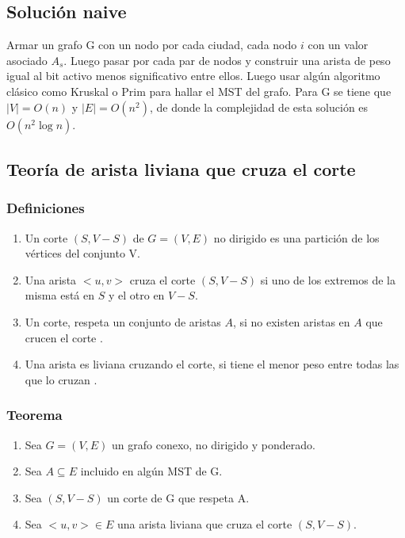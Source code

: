 \documentclass{article}
\begin{document}
\subsection{Solución naive}

Armar un grafo G con un nodo por cada ciudad, cada nodo $i$ con un valor asociado $A_s$. Luego pasar por cada par de nodos y construir una arista de peso igual al bit activo menos significativo entre ellos. Luego usar algún algoritmo clásico como Kruskal o Prim para hallar el MST del grafo. Para G se tiene que $|V| = O(n)$ y $|E| = O(n^2)$, de donde la complejidad de esta solución es $O(n^2 \log n)$.

\subsection{Teoría de arista liviana que cruza el corte}

\subsubsection{Definiciones}

\begin{enumerate}
    \item Un corte $(S, V-S)$ de $G=(V,E)$ no dirigido es una partición de los vértices del conjunto V.
    \item Una arista $<u,v>$ cruza el corte $(S, V-S)$ si uno de los extremos de la misma está en $S$ y el otro en $V-S$.
    \item Un corte, respeta un conjunto de aristas $A$, si no existen aristas en $A$ que crucen el corte .
    \item Una arista es liviana cruzando el corte, si tiene el menor peso entre todas las que lo cruzan .
\end{enumerate}

\subsubsection{Teorema}

\begin{enumerate}
    \item Sea $G=(V,E)$ un grafo conexo, no dirigido y ponderado.
    \item Sea $A \subseteq E$ incluido en algún MST de G.
    \item Sea $(S, V-S)$ un corte de G que respeta A.
    \item Sea $<u,v> \in E$ una arista liviana que cruza el corte $(S, V-S)$.
\end{enumerate}
\end{document}
